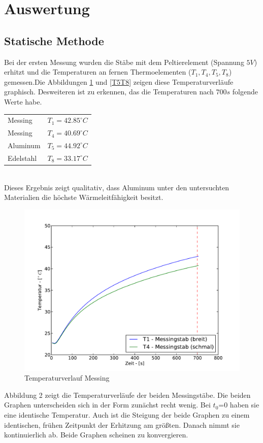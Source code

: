 \documentclass[11pt]{article}
\begin{document}
\section{Auswertung}
\subsection{Statische Methode}

Bei der ersten Messung wurden die Stäbe mit dem Peltierelement (Spannung $5V$) erhitzt und die Temperaturen an fernen Thermoelementen ($T_1, T_4, T_5, T_8$) gemessen.Die Abbildungen \ref{T1T4} und \ref{T5T8} zeigen diese Temperaturverläufe graphisch. Desweiteren ist zu erkennen, das die Temperaturen nach $700s$ folgende Werte habe.

\begin{tabular}{@{$\bullet$  }ll}
Messing &$T_1= 42.85 ^\circ C$\\
Messing &$T_4 =  40.69 ^\circ C$\\
Aluminum &$T_5 = 44.92 ^\circ C$\\
Edelstahl &$T_8 =33.17 ^\circ C$\\

\end{tabular}\\
Dieses Ergebnis zeigt qualitativ, dass Aluminum unter den untersuchten Materialien die höchste Wärmeleitfähigkeit besitzt.
\begin{figure}[H]
\centering
\includegraphics[width = \textwidth]{Diagramme/Abb1.pdf}
\caption{Temperaturverlauf Messing}
\label{T1T4}
\end{figure}
Abbildung 2 zeigt die Temperaturverläufe der beiden Messingstäbe. Die beiden Graphen unterscheiden sich in der Form zunächst recht wenig. Bei $t_0$=0 haben sie eine identische Temperatur. Auch ist die Steigung der beide Graphen zu einem identischen, frühen Zeitpunkt der Erhitzung am größten. Danach nimmt sie kontinuierlich ab. Beide Graphen scheinen zu konvergieren.\newline
\end{document}
